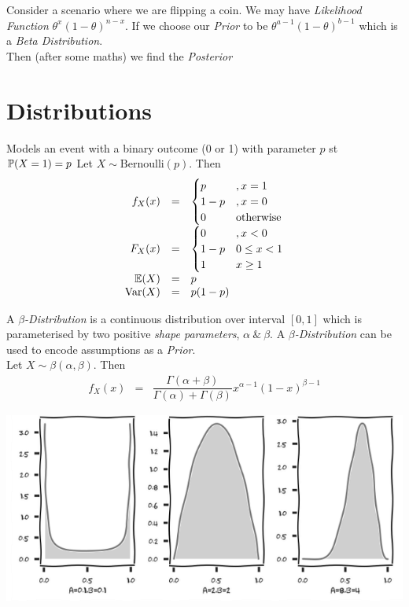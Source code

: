 \documentclass[11pt,a4paper]{article}
\begin{document}
Consider a scenario where we are flipping a coin. We may have \textit{Likelihood Function} $\theta^x(1-\theta)^{n-x}$. If we choose our \textit{Prior} to be $\theta^{a-1}(1-\theta)^{b-1}$ which is a \textit{Beta Distribution}.\\
Then (after some maths) we find the \textit{Posterior}

\section{Distributions}

Models an event with a binary outcome (0 or 1) with parameter $p$ st $\mathbb{P}(X=1)=p$
Let $X\sim\text{Bernoulli}(p)$. Then
\[\begin{array}{rcl}
f_X(x)&=&\begin{cases}
p&, x=1\\
1-p&, x=0\\
0&\text{otherwise}
\end{cases}\\
F_X(x)&=&\begin{cases}
0&,x<0\\
1-p&0\leq x<1\\
1&x\geq1
\end{cases}\\
\mathbb{E}(X)&=&p\\
\text{Var}(X)&=&p(1-p)
\end{array}\]

A \textit{$\beta$-Distribution} is a continuous distribution over interval $[0,1]$ which is parameterised by two positive \textit{shape parameters}, $\alpha\ \&\ \beta$. A \textit{$\beta$-Distribution} can be used to encode assumptions as a \textit{Prior}.\\
Let $X\sim\beta(\alpha,\beta)$. Then
\[\begin{array}{rcl}
f_X(x)&=&\dfrac{\Gamma(\alpha+\beta)}{\Gamma(\alpha)+\Gamma(\beta)}x^{\alpha-1}(1-x)^{\beta-1}
\end{array}\]

\includegraphics[scale=.6]{img/betaExamples.png}
\end{document}
